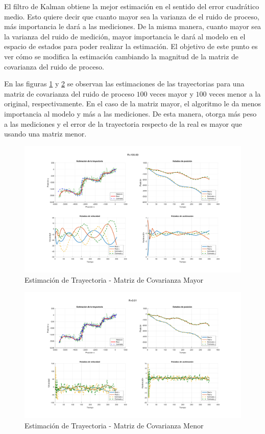 
	El filtro de Kalman obtiene la mejor estimación en el sentido del error cuadrático medio. Esto quiere decir que cuanto mayor sea la varianza de el ruido de proceso, más importancia le dará a las mediciones. De la misma manera, cuanto mayor sea la varianza del ruido de medición, mayor importancia le dará al modelo en el espacio de estados para poder realizar la estimación. El objetivo de este punto es ver cómo se modifica la estimación cambiando la magnitud de la matriz de covarianza del ruido de proceso.
	
	En las figuras \ref{fig:ej5r1} y \ref{fig:ej5r2} se observan las estimaciones de las trayectorias para una matriz de covarianza del ruido de proceso $100$ veces mayor y $100$ veces menor a la original, respectivamente. En el caso de la matriz mayor, el algoritmo le da menos importancia al modelo y más a las mediciones. De esta manera, otorga más peso a las mediciones y el error de la trayectoria respecto de la real es mayor que usando una matriz menor.
	
	\begin{figure}[H]
		\centering
		\includegraphics[scale=0.5,trim={6,5cm 0 0 0}]{Figuras/graf_ej6_R1.pdf}
		\caption{Estimación de Trayectoria - Matriz de Covarianza Mayor}
		\label{fig:ej5r1}
	\end{figure}
	
	\begin{figure}[H]
		\centering
		\includegraphics[scale=0.5,trim={6,5cm 0 0 0}]{Figuras/graf_ej6_R2.pdf}
		\caption{Estimación de Trayectoria - Matriz de Covarianza Menor}
		\label{fig:ej5r2}
	\end{figure}
	
